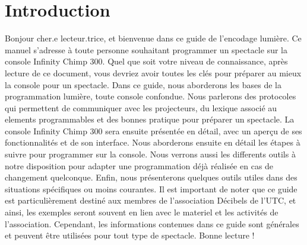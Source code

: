 \chapter{Introduction}
\label{chap:introduction}

Bonjour cher.e lecteur.trice, et bienvenue dans ce guide de l'encodage lumière.
Ce manuel s'adresse à toute personne souhaitant programmer un spectacle sur la console Infinity Chimp 300.
Quel que soit votre niveau de connaissance, après lecture de ce document, vous devriez avoir toutes les clés pour préparer au mieux la console pour un spectacle.
\newline
\newline
Dans ce guide, nous aborderons les bases de la programmation lumière, toute console confondue.
Nous parlerons des protocoles qui permettent de communiquer avec les projecteurs, du lexique associé au elements programmables et des bonnes pratique pour préparer un spectacle.
\newline
La console Infinity Chimp 300 sera ensuite présentée en détail, avec un aperçu de ses fonctionnalités et de son interface.
\newline
Nous aborderons ensuite en détail les étapes à suivre pour programmer sur la console.
\newline
Nous verrons aussi les differents outils à notre disposition pour adapter une programmation déjà réalisée en cas de changement quelconque.
\newline
Enfin, nous présenterons quelques outils utiles dans des situations spécifiques ou moins courantes.
\newline
\newline
Il est important de noter que ce guide est particulièrement destiné aux membres de l'association Décibels de l'UTC,
et ainsi, les exemples seront souvent en lien avec le materiel et les activités de l'association.
Cependant, les informations contenues dans ce guide sont générales et peuvent être utilisées pour tout type de spectacle.
\newline
\newline
Bonne lecture !
